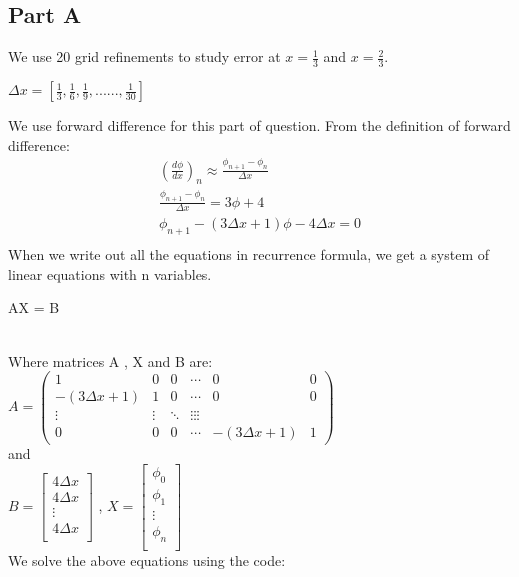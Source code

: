 \documentclass{article}
\begin{document}
    \subsection{Part A} %
    \label{sub:p5_a}
    We use 20 grid refinements to study error at $x=\frac{1}{3}$ and $x=\frac{2}{3}$.\\
    \centerline{$\Delta x = [\frac{1}{3}, \frac{1}{6}, \frac{1}{9},......, \frac{1}{30}]$}
    We use forward difference for this part of question. From the definition of forward difference:\\
    \begin{align}(\frac{d \phi}{d x})_n \approx \frac{\phi_{n+1} - \phi_{n}}{\Delta x}\\ \nonumber
     \frac{\phi_{n+1} - \phi_{n}}{\Delta x} = 3\phi + 4 \\ \nonumber
     \phi_{n+1} -(3 \Delta x +1)\phi - 4\Delta x = 0 \\ \nonumber
     \end{align}
     When we write out all the equations in recurrence formula, we get a system of linear equations with n variables.\\
     \centerline{AX = B}\\
     Where matrices A , X and B are:\\
     $A = 
     \begin{pmatrix}
      1 & 0 & 0 & \cdots & 0 & 0\\
     -(3 \Delta x +1) & 1 & 0 & \cdots & 0 &0\\
     \vdots  & \vdots  & \ddots & \vdots \vdots \vdots \\
    0 & 0 & 0 & \cdots & -(3 \Delta x +1) & 1
     \end{pmatrix}$\\
     and\\
     $B =
     \begin{bmatrix}
     4 \Delta x \\
     4 \Delta x \\
     \vdots \\
     4 \Delta x \\    
     \end{bmatrix}$
     , \hspace{6mm}
     $X =
     \begin{bmatrix}
     \phi _0 \\
     \phi _1 \\
     \vdots \\
     \phi _n \\    
     \end{bmatrix}$\\
     We solve the above equations using the code:
\end{document}
